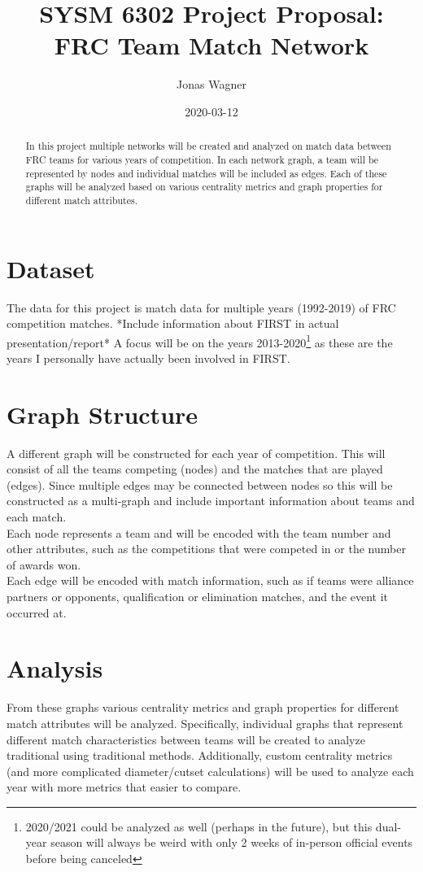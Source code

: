 \documentclass[]{article}
\title{SYSM 6302 Project Proposal:\\
FRC Team Match Network}
\author{Jonas Wagner}
\date{2020-03-12}
\begin{document}
\maketitle

\begin{abstract}
	In this project multiple networks will be created and analyzed on match data between FRC teams for various years of competition. In each network graph, a team will be represented by nodes and individual matches will be included as edges. Each of these graphs will be analyzed based on various centrality metrics and graph properties for different match attributes.
\end{abstract}

\section{Dataset}
The data for this project is match data for multiple years (1992-2019)  of FRC competition matches. *Include information about FIRST in actual presentation/report* A focus will be on the years 2013-2020\footnote{2020/2021 could be analyzed as well (perhaps in the future), but this dual-year season will always be weird with only 2 weeks of in-person official events before being canceled} as these are the years I personally have actually been involved in FIRST.

\section{Graph Structure}
A different graph will be constructed for each year of competition. This will consist of all the teams competing (nodes) and the matches that are played (edges). Since multiple edges may be connected between nodes so this will be constructed as a multi-graph and include important information about teams and each match.\\

Each node represents a team and will be encoded with the team number and other attributes, such as the competitions that were competed in or the number of awards won.\\

Each edge will be encoded with match information, such as if teams were alliance partners or opponents, qualification or elimination matches, and the event it occurred at.

\section{Analysis}
From these graphs various centrality metrics and graph properties for different match attributes will be analyzed. Specifically, individual graphs that represent different match characteristics between teams will be created to analyze traditional using traditional methods. Additionally, custom centrality metrics (and more complicated diameter/cutset calculations) will be used to analyze each year with more metrics that easier to compare.
\end{document}
